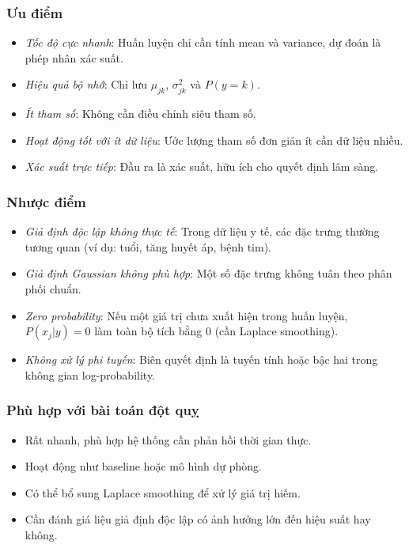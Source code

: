 ﻿\documentclass{article}
\begin{document}
\subsubsection*{Ưu điểm}
\begin{itemize}
    \item \textit{Tốc độ cực nhanh}: Huấn luyện chỉ cần tính mean và variance, dự đoán là phép nhân xác suất.
    \item \textit{Hiệu quả bộ nhớ}: Chỉ lưu $\mu_{jk}$, $\sigma_{jk}^2$ và $P(y=k)$.
    \item \textit{Ít tham số}: Không cần điều chỉnh siêu tham số.
    \item \textit{Hoạt động tốt với ít dữ liệu}: Ước lượng tham số đơn giản ít cần dữ liệu nhiều.
    \item \textit{Xác suất trực tiếp}: Đầu ra là xác suất, hữu ích cho quyết định lâm sàng.
\end{itemize}

\subsubsection*{Nhược điểm}
\begin{itemize}
    \item \textit{Giả định độc lập không thực tế}: Trong dữ liệu y tế, các đặc trưng thường tương quan (ví dụ: tuổi, tăng huyết áp, bệnh tim).
    \item \textit{Giả định Gaussian không phù hợp}: Một số đặc trưng không tuân theo phân phối chuẩn.
    \item \textit{Zero probability}: Nếu một giá trị chưa xuất hiện trong huấn luyện, $P(x_j|y)=0$ làm toàn bộ tích bằng 0 (cần Laplace smoothing).
    \item \textit{Không xử lý phi tuyến}: Biên quyết định là tuyến tính hoặc bậc hai trong không gian log-probability.
\end{itemize}

\subsubsection*{Phù hợp với bài toán đột quỵ}
\begin{itemize}
    \item Rất nhanh, phù hợp hệ thống cần phản hồi thời gian thực.
    \item Hoạt động như baseline hoặc mô hình dự phòng.
    \item Có thể bổ sung Laplace smoothing để xử lý giá trị hiếm.
    \item Cần đánh giá liệu giả định độc lập có ảnh hưởng lớn đến hiệu suất hay không.
\end{itemize}
\end{document}
